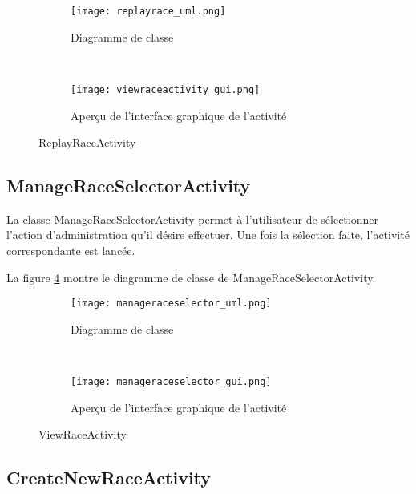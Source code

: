 \begin{figure}[htb!]
    \centering
    \begin{subfigure}[htb]{0.49\textwidth}
		\texttt{[image: replayrace\_uml.png]} 
		\caption{Diagramme de classe}
		\label{fig:replayrace_uml}
    \end{subfigure}
    ~ %
    \begin{subfigure}[htb]{0.49\textwidth}
		\texttt{[image: viewraceactivity\_gui.png]} 
		\caption{Aperçu de l'interface graphique de l'activité}
		\label{fig:replayrace_gui}
    \end{subfigure}
    \caption{ReplayRaceActivity}\label{fig:replayrace_fig}
\end{figure}


\subsection{ManageRaceSelectorActivity}

La classe ManageRaceSelectorActivity permet à l'utilisateur de sélectionner l'action d'administration qu'il désire effectuer. Une fois la sélection  faite, l'activité correspondante est lancée.

La figure \ref{fig:manageraceselector_uml} montre le diagramme de classe de ManageRaceSelectorActivity.

\begin{figure}[htb!]
    \centering
    \begin{subfigure}[htb]{0.49\textwidth}
		\texttt{[image: manageraceselector\_uml.png]} 
		\caption{Diagramme de classe}
		\label{fig:manageraceselector_uml}
    \end{subfigure}
    ~ %
    \begin{subfigure}[htb]{0.49\textwidth}
		\texttt{[image: manageraceselector\_gui.png]} 
		\caption{Aperçu de l'interface graphique de l'activité}
		\label{fig:manageraceselector_gui}
    \end{subfigure}
    \caption{ViewRaceActivity}\label{fig:manageraceselector_fig}
\end{figure}

\subsection{CreateNewRaceActivity}

